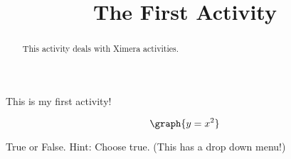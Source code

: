 \documentclass{ximera}
\title{The First Activity}
\begin{document}
      
\begin{abstract}
      
This activity deals with Ximera activities.
      
\end{abstract}
      
\maketitle

This is my first activity!

\begin{center}
\begin{foldable}
\end{foldable}
\end{center}


\[
\graph{y=x^2}
\]

\begin{problem}
\begin{selectAll}
\end{selectAll}
\end{problem}


\begin{question}
True or False. Hint: Choose true. (This has a drop down menu!) 
\end{question}
\end{document}
